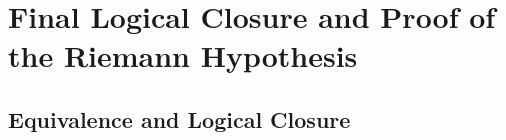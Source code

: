 \section{Final Logical Closure and Proof of the Riemann Hypothesis}
\label{sec:logical_closure}





\subsection{Equivalence and Logical Closure}


















